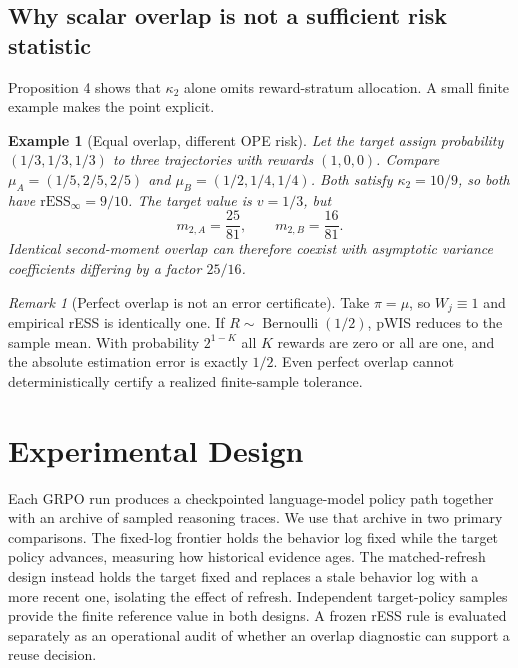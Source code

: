 \documentclass[10pt]{article}
\newtheorem{example}{Example}
\theoremstyle{remark}
\newtheorem{remark}{Remark}
\newcommand{\rESS}{\mathrm{rESS}}
\begin{document}
\subsection{Why scalar overlap is not a sufficient risk statistic}
Proposition 4 shows that $\kappa_2$ alone omits reward-stratum allocation. A small finite example makes the point explicit.

\begin{example}[Equal overlap, different OPE risk]
Let the target assign probability $(1/3,1/3,1/3)$ to three trajectories with rewards $(1,0,0)$. Compare $\mu_A=(1/5,2/5,2/5)$ and $\mu_B=(1/2,1/4,1/4)$. Both satisfy $\kappa_2=10/9$, so both have $\rESS_\infty=9/10$. The target value is $v=1/3$, but
\begin{equation}
m_{2,A}=\frac{25}{81},\qquad m_{2,B}=\frac{16}{81}.
\end{equation}
Identical second-moment overlap can therefore coexist with asymptotic variance coefficients differing by a factor $25/16$.
\end{example}

\begin{remark}[Perfect overlap is not an error certificate]
Take $\pi=\mu$, so $W_j\equiv1$ and empirical rESS is identically one. If $R\sim\operatorname{Bernoulli}(1/2)$, pWIS reduces to the sample mean. With probability $2^{1-K}$ all $K$ rewards are zero or all are one, and the absolute estimation error is exactly $1/2$. Even perfect overlap cannot deterministically certify a realized finite-sample tolerance.
\end{remark}

\section{Experimental Design}
Each GRPO run produces a checkpointed language-model policy path together with an archive of sampled reasoning traces. We use that archive in two primary comparisons. The fixed-log frontier holds the behavior log fixed while the target policy advances, measuring how historical evidence ages. The matched-refresh design instead holds the target fixed and replaces a stale behavior log with a more recent one, isolating the effect of refresh. Independent target-policy samples provide the finite reference value in both designs. A frozen rESS rule is evaluated separately as an operational audit of whether an overlap diagnostic can support a reuse decision.
\end{document}
